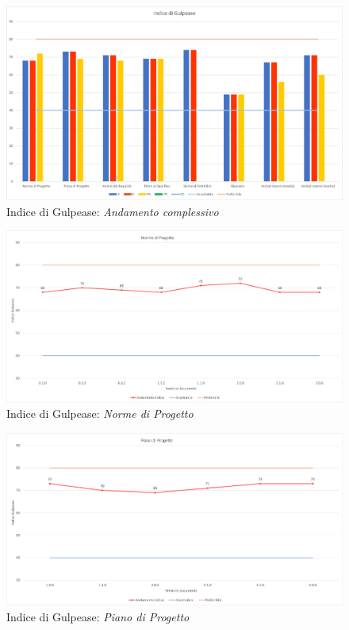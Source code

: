\begin{figure}[!ht]
    \caption{Indice di Gulpease: \textit{Andamento complessivo}}
    \vspace{10px}
    \includegraphics[scale=0.5]{sezioni/immagini/GulpeaseGenerale.png}
    \centering
\end{figure}
\pagebreak
{}
\begin{figure}[!ht]
    \caption{Indice di Gulpease: \textit{Norme di Progetto}}
    \vspace{10px}
    \includegraphics[scale=0.5]{sezioni/immagini/NormeGulpease.png}
    \centering
\end{figure}
\begin{figure}[!ht]
    \caption{Indice di Gulpease: \textit{Piano di Progetto}}
    \vspace{10px}
    \includegraphics[scale=0.5]{sezioni/immagini/PianoProgettoGulpease.png}
    \centering
\end{figure}
